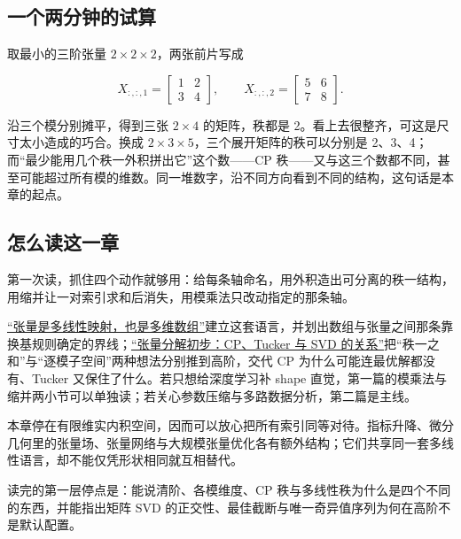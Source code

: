 \subsection{一个两分钟的试算}

取最小的三阶张量 \(2\times2\times2\)，两张前片写成

\[
X_{:,:,1}=\begin{bmatrix}1&2\\3&4\end{bmatrix},
\qquad
X_{:,:,2}=\begin{bmatrix}5&6\\7&8\end{bmatrix}.
\]

沿三个模分别摊平，得到三张 \(2\times4\) 的矩阵，秩都是 2。看上去很整齐，可这是尺寸太小造成的巧合。换成 \(2\times3\times5\)，三个展开矩阵的秩可以分别是 2、3、4；而``最少能用几个秩一外积拼出它''这个数——CP 秩——又与这三个数都不同，甚至可能超过所有模的维数。同一堆数字，沿不同方向看到不同的结构，这句话是本章的起点。

\subsection{怎么读这一章}

第一次读，抓住四个动作就够用：给每条轴命名，用外积造出可分离的秩一结构，用缩并让一对索引求和后消失，用模乘法只改动指定的那条轴。

\hyperref[sec:03-Linear-Algebra/09-Tensors/01]{``张量是多线性映射，也是多维数组''}建立这套语言，并划出数组与张量之间那条靠换基规则确定的界线；\hyperref[sec:03-Linear-Algebra/09-Tensors/02]{``张量分解初步：CP、Tucker 与 SVD 的关系''}把``秩一之和''与``逐模子空间''两种想法分别推到高阶，交代 CP 为什么可能连最优解都没有、Tucker 又保住了什么。若只想给深度学习补 shape 直觉，第一篇的模乘法与缩并两小节可以单独读；若关心参数压缩与多路数据分析，第二篇是主线。

本章停在有限维实内积空间，因而可以放心把所有索引同等对待。指标升降、微分几何里的张量场、张量网络与大规模张量优化各有额外结构；它们共享同一套多线性语言，却不能仅凭形状相同就互相替代。

读完的第一层停点是：能说清阶、各模维度、CP 秩与多线性秩为什么是四个不同的东西，并能指出矩阵 SVD 的正交性、最佳截断与唯一奇异值序列为何在高阶不是默认配置。
